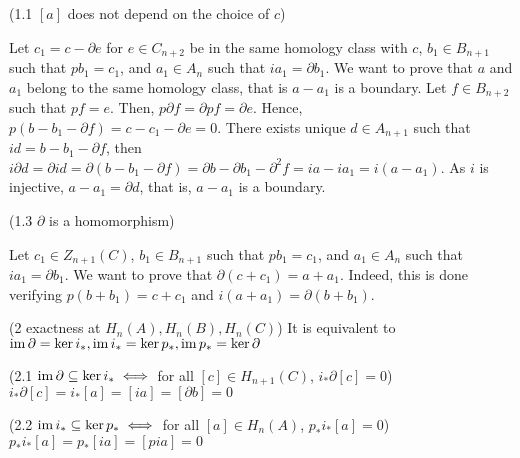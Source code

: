 \documentclass{report}
\begin{document}
\begin{longproof}
    (1.1 $[a]$ does not depend on the choice of $c$)

\begin{center}
\end{center}

    Let $c_1 = c - \partial e$ for $e \in C_{n+2}$ be in the same homology class with $c$, $b_1 \in B_{n+1}$ such that $pb_1 = c_1$, and $a_1 \in A_n$ such that $ia_1 = \partial b_1$. We want to prove that $a$ and $a_1$ belong to the same homology class, that is $a - a_1$ is a boundary. Let $f \in B_{n+2}$ such that $pf = e$. Then, $p \partial f = \partial pf = \partial e$. Hence, $p(b - b_1 - \partial f) = c - c_1 - \partial e = 0$. There exists unique $d \in A_{n+1}$ such that $id = b - b_1 - \partial f$, then $i \partial d = \partial id = \partial (b - b_1 - \partial f) = \partial b - \partial b_1 - \partial^2 f = ia - ia_1 = i(a - a_1)$. As $i$ is injective, $a - a_1 = \partial d$, that is, $a - a_1$ is a boundary.

    (1.3 $\partial$ is a homomorphism) 

    Let $c_1 \in Z_{n+1}(C)$, $b_1 \in B_{n+1}$ such that $pb_1 = c_1$, and $a_1 \in A_n$ such that $ia_1 = \partial b_1$. We want to prove that $\partial (c + c_1) = a + a_1$. Indeed, this is done verifying $p(b + b_1) = c + c_1$ and $i(a + a_1) = \partial(b + b_1)$.

    (2 exactness at $H_n(A), H_n(B), H_n(C)$) It is equivalent to $\operatorname{im} \partial = \ker i_*, \operatorname{im} i_* = \ker p_*, \operatorname{im} p_* = \ker \partial$

    (2.1 $\operatorname{im} \partial \subseteq \ker i_* \iff $ for all $[c] \in H_{n+1}(C)$, $i_* \partial [c] = 0$) $i_* \partial [c] = i_* [a] = [ia] = [\partial b] = 0$

    (2.2 $\operatorname{im} i_* \subseteq \ker p_* \iff $ for all $[a] \in H_n(A)$, $p_* i_* [a] = 0$) $p_* i_* [a] = p_* [ia] = [pia] = 0$


\end{longproof}
\end{document}
